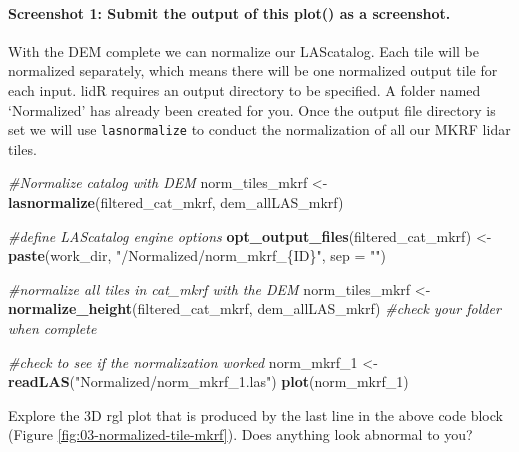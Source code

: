 \documentclass[
]{book}
\newenvironment{Shaded}{\begin{snugshade}}{\end{snugshade}}
\newcommand{\AttributeTok}[1]{\textcolor[rgb]{0.13,0.29,0.53}{#1}}
\newcommand{\CommentTok}[1]{\textcolor[rgb]{0.56,0.35,0.01}{\textit{#1}}}
\newcommand{\FunctionTok}[1]{\textcolor[rgb]{0.13,0.29,0.53}{\textbf{#1}}}
\newcommand{\NormalTok}[1]{#1}
\newcommand{\OtherTok}[1]{\textcolor[rgb]{0.56,0.35,0.01}{#1}}
\newcommand{\StringTok}[1]{\textcolor[rgb]{0.31,0.60,0.02}{#1}}
\begin{document}
\hypertarget{screenshot-1-submit-the-output-of-this-plot-as-a-screenshot.}{%
\paragraph*{Screenshot 1: Submit the output of this plot() as a screenshot.}\label{screenshot-1-submit-the-output-of-this-plot-as-a-screenshot.}}

With the DEM complete we can normalize our LAScatalog. Each tile will be normalized separately, which means there will be one normalized output tile for each input. lidR requires an output directory to be specified. A folder named `Normalized' has already been created for you. Once the output file directory is set we will use \texttt{lasnormalize} to conduct the normalization of all our MKRF lidar tiles.

\begin{Shaded}
\begin{Highlighting}[]
\CommentTok{\#Normalize catalog with DEM}
\NormalTok{norm\_tiles\_mkrf }\OtherTok{\textless{}{-}} \FunctionTok{lasnormalize}\NormalTok{(filtered\_cat\_mkrf, dem\_allLAS\_mkrf)}

\CommentTok{\#define LAScatalog engine options}
\FunctionTok{opt\_output\_files}\NormalTok{(filtered\_cat\_mkrf) }\OtherTok{\textless{}{-}} \FunctionTok{paste}\NormalTok{(work\_dir, }\StringTok{"/Normalized/norm\_mkrf\_\{ID\}"}\NormalTok{, }\AttributeTok{sep =} \StringTok{""}\NormalTok{)}

\CommentTok{\#normalize all tiles in cat\_mkrf with the DEM }
\NormalTok{norm\_tiles\_mkrf }\OtherTok{\textless{}{-}} \FunctionTok{normalize\_height}\NormalTok{(filtered\_cat\_mkrf, dem\_allLAS\_mkrf) }\CommentTok{\#check your folder when complete }

\CommentTok{\#check to see if the normalization worked}
\NormalTok{norm\_mkrf\_1 }\OtherTok{\textless{}{-}} \FunctionTok{readLAS}\NormalTok{(}\StringTok{"Normalized/norm\_mkrf\_1.las"}\NormalTok{)}
\FunctionTok{plot}\NormalTok{(norm\_mkrf\_1) }
\end{Highlighting}
\end{Shaded}

Explore the 3D rgl plot that is produced by the last line in the above code block (Figure \ref{fig:03-normalized-tile-mkrf}). Does anything look abnormal to you?
\end{document}
